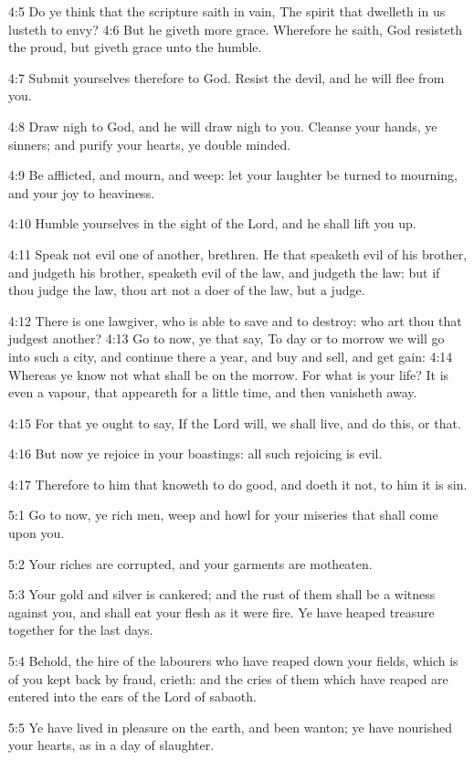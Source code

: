 4:5 Do ye think that the scripture saith in vain, The spirit that dwelleth in us lusteth to envy?  4:6 But he giveth more grace.  Wherefore he saith, God resisteth the proud, but giveth grace unto the humble.

4:7 Submit yourselves therefore to God. Resist the devil, and he will flee from you.

4:8 Draw nigh to God, and he will draw nigh to you. Cleanse your hands, ye sinners; and purify your hearts, ye double minded.

4:9 Be afflicted, and mourn, and weep: let your laughter be turned to mourning, and your joy to heaviness.

4:10 Humble yourselves in the sight of the Lord, and he shall lift you up.

4:11 Speak not evil one of another, brethren. He that speaketh evil of his brother, and judgeth his brother, speaketh evil of the law, and judgeth the law: but if thou judge the law, thou art not a doer of the law, but a judge.

4:12 There is one lawgiver, who is able to save and to destroy: who art thou that judgest another?  4:13 Go to now, ye that say, To day or to morrow we will go into such a city, and continue there a year, and buy and sell, and get gain: 4:14 Whereas ye know not what shall be on the morrow. For what is your life? It is even a vapour, that appeareth for a little time, and then vanisheth away.

4:15 For that ye ought to say, If the Lord will, we shall live, and do this, or that.

4:16 But now ye rejoice in your boastings: all such rejoicing is evil.

4:17 Therefore to him that knoweth to do good, and doeth it not, to him it is sin.

5:1 Go to now, ye rich men, weep and howl for your miseries that shall come upon you.

5:2 Your riches are corrupted, and your garments are motheaten.

5:3 Your gold and silver is cankered; and the rust of them shall be a witness against you, and shall eat your flesh as it were fire. Ye have heaped treasure together for the last days.

5:4 Behold, the hire of the labourers who have reaped down your fields, which is of you kept back by fraud, crieth: and the cries of them which have reaped are entered into the ears of the Lord of sabaoth.

5:5 Ye have lived in pleasure on the earth, and been wanton; ye have nourished your hearts, as in a day of slaughter.

